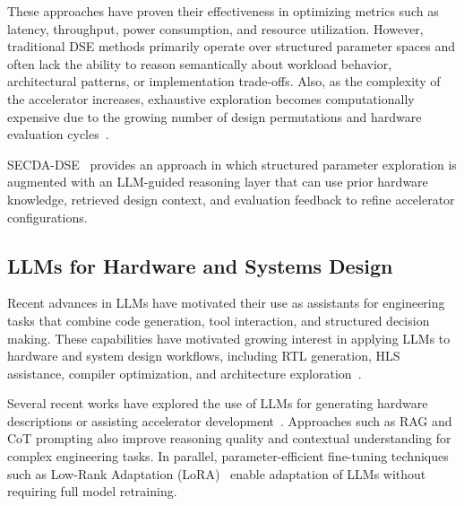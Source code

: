 These approaches have proven their effectiveness in optimizing metrics such as latency, throughput, power consumption, and resource utilization. However, traditional DSE methods primarily operate over structured parameter spaces and often lack the ability to reason semantically about workload behavior, architectural patterns, or implementation trade-offs. Also, as the complexity of the accelerator increases, exhaustive exploration becomes computationally expensive due to the growing number of design permutations and hardware evaluation cycles~\cite{xu2025hardware}.

SECDA-DSE~\cite{sharma2026llm} provides an approach in which structured parameter exploration is augmented with an LLM-guided reasoning layer that can use prior hardware knowledge, retrieved design context, and evaluation feedback to refine accelerator configurations.



\subsection{LLMs for Hardware and Systems Design}


Recent advances in LLMs have motivated their use as assistants for engineering tasks that combine code generation, tool interaction, and structured decision making.
These capabilities have motivated growing interest in applying LLMs to hardware and system design workflows, including RTL generation, HLS assistance, compiler optimization, and architecture exploration~\cite{liao2024llms, li2025idse, zhang2026luminallmguidedgpuarchitecture}.

Several recent works have explored the use of LLMs for generating hardware descriptions or assisting accelerator development~\cite{fu2023gpt4aigchip, firouzi2024llm, vungarala2025sa}. Approaches such as RAG and CoT prompting also improve reasoning quality and contextual understanding for complex engineering tasks. In parallel, parameter-efficient fine-tuning techniques such as Low-Rank Adaptation (LoRA)~\cite{hu2022lora} enable adaptation of LLMs without requiring full model retraining.

